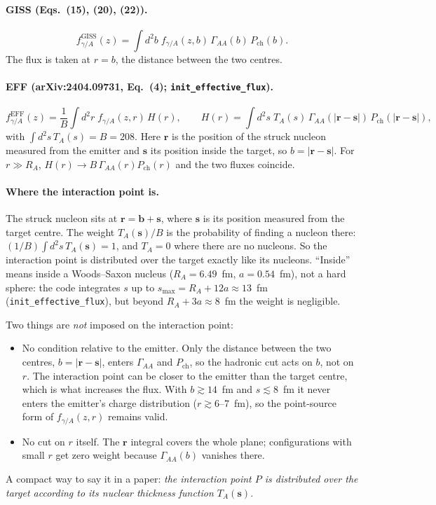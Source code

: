 \documentclass[11pt]{article}
\begin{document}
\paragraph{GISS (Eqs.~(15), (20), (22)).}
\begin{equation}
  f^{\text{GISS}}_{\gamma/A}(z)=\int d^2b\; f_{\gamma/A}(z,b)\,\Gamma_{AA}(b)\,P_{\text{ch}}(b).
\end{equation}
The flux is taken at $r=b$, the distance between the two centres.

\paragraph{EFF (arXiv:2404.09731, Eq.~(4); \texttt{init\_effective\_flux}).}
\begin{equation}
  f^{\text{EFF}}_{\gamma/A}(z)=\frac{1}{B}\int d^2r\; f_{\gamma/A}(z,r)\,H(r),\qquad
  H(r)=\int d^2s\; T_A(s)\,\Gamma_{AA}(|\mathbf r-\mathbf s|)\,P_{\text{ch}}(|\mathbf r-\mathbf s|),
\end{equation}
with $\int d^2s\,T_A(s)=B=208$. Here $\mathbf r$ is the position of the struck nucleon measured
from the emitter and $\mathbf s$ its position inside the target, so $b=|\mathbf r-\mathbf s|$.
For $r\gg R_A$, $H(r)\to B\,\Gamma_{AA}(r)P_{\text{ch}}(r)$ and the two fluxes coincide.

\paragraph{Where the interaction point is.} The struck nucleon sits at $\mathbf r=\mathbf b+\mathbf s$,
where $\mathbf s$ is its position measured from the target centre. The weight $T_A(\mathbf s)/B$
is the probability of finding a nucleon there: $(1/B)\int d^2s\,T_A(\mathbf s)=1$, and
$T_A=0$ where there are no nucleons. So the interaction point is distributed over the target
exactly like its nucleons. ``Inside'' means inside a Woods--Saxon nucleus ($R_A=6.49$~fm,
$a=0.54$~fm), not a hard sphere: the code integrates $s$ up to $s_{\max}=R_A+12a\approx13$~fm
(\texttt{init\_effective\_flux}), but beyond $R_A+3a\approx 8$~fm the weight is negligible.

Two things are \emph{not} imposed on the interaction point:
\begin{itemize}
\item No condition relative to the emitter. Only the distance between the two centres,
  $b=|\mathbf r-\mathbf s|$, enters $\Gamma_{AA}$ and $P_{\text{ch}}$, so the hadronic cut acts
  on $b$, not on $r$. The interaction point can be closer to the emitter than the target centre,
  which is what increases the flux. With $b\gtrsim14$~fm and $s\lesssim 8$~fm it never enters the
  emitter's charge distribution ($r\gtrsim 6$--7~fm), so the point-source form of
  $f_{\gamma/A}(z,r)$ remains valid.
\item No cut on $r$ itself. The $\mathbf r$ integral covers the whole plane; configurations with
  small $r$ get zero weight because $\Gamma_{AA}(b)$ vanishes there.
\end{itemize}
A compact way to say it in a paper: \emph{the interaction point $P$ is distributed over the
target according to its nuclear thickness function $T_A(\mathbf s)$.}
\end{document}
